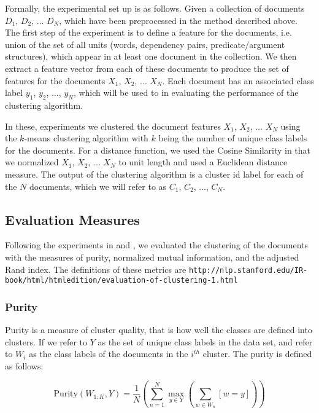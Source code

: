 \documentclass[11pt]{article}
\begin{document}
Formally, the experimental set up is as follows. Given a collection of documents $D_1$, $D_2$, $\dots$ $D_N$,  which have been preprocessed in the method described above. The first step of the experiment is to define a feature for the documents, i.e. union of the set of all units (words, dependency pairs, predicate/argument structures), which appear in at least one document in the collection. We then extract a feature vector from each of these documents to produce the set of features for the documents $X_1$, $X_2$, $\dots$ $X_N$. Each document has an associated class label $y_1$, $y_2$, $\dots$, $y_N$, which will be used to in evaluating the performance of the clustering algorithm.

In these, experiments we clustered the document features $X_1$, $X_2$, $\dots$ $X_N$ using the $k$-means clustering algorithm with $k$ being the number of unique class labels for the documents. For a distance function, we used the Cosine Similarity in that we normalized $X_1$, $X_2$, $\dots$ $X_N$  to unit length and used a Euclidean distance measure. The output of the clustering algorithm is a cluster id label for each of the $N$ documents, which we will refer to as $C_1$, $C_2$, $\dots$, $C_N$. 


\subsection{Evaluation Measures}

Following the experiments in \cite{Huang2008} and \cite{Hofmann2000}, we evaluated the clustering of the documents with the measures of purity, normalized mutual information, and the adjusted Rand index. The definitions of these metrics are {\tt http://nlp.stanford.edu/IR-book/html/htmledition/evaluation-of-clustering-1.html}

\subsubsection{Purity}

Purity is a measure of cluster quality, that is how well the classes are defined into clusters. If we refer to $Y$ as the set of unique class labels in the data set, and refer to $W_i$ as the class labels of the documents in the $i^{th}$ cluster. The purity is defined as follows:

\begin{equation}
{\text{Purity}}(W_{1:K}, Y) = \frac{1}{N} \left ( \sum_{n=1}^N \max_{y \in Y} \left (\sum_{w \in W_n} [w = y] \right ) \right )
\end{equation} 
\end{document}
